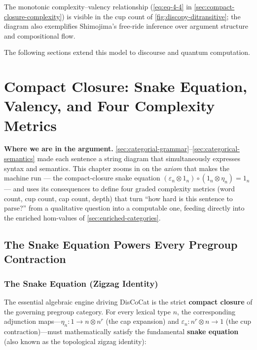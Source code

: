 \documentclass[
]{article}
\begin{document}
The monotonic complexity--valency relationship (\autoref{eq:eq-4-4} in
\autoref{sec:compact-closure-complexity}) is visible in the cup count of
\autoref{fig:discopy-ditransitive}; the diagram also exemplifies
Shimojima's \citeyearpar{shimojima1996reasoning} free-ride inference
over argument structure and compositional flow.

The following sections extend this model to discourse and quantum
computation.

\newpage

\section{Compact Closure: Snake Equation, Valency, and Four Complexity
Metrics}\label{sec:compact-closure-complexity}

\textbf{Where we are in the argument.}
\autoref{sec:categorial-grammar}--\autoref{sec:categorical-semantics}
made each sentence a string diagram that simultaneously expresses syntax
and semantics. This chapter zooms in on the \emph{axiom} that makes the
machine run --- the compact-closure snake equation
\((\varepsilon_n \otimes 1_n) \circ (1_n \otimes \eta_n) = 1_n\) --- and
uses its consequences to define four graded complexity metrics (word
count, cup count, cap count, depth) that turn ``how hard is this
sentence to parse?'' from a qualitative question into a computable one,
feeding directly into the enriched hom-values of
\autoref{sec:enriched-categories}.

\subsection{The Snake Equation Powers Every Pregroup
Contraction}\label{the-snake-equation-powers-every-pregroup-contraction}

\subsubsection{The Snake Equation (Zigzag
Identity)}\label{the-snake-equation-zigzag-identity}

The essential algebraic engine driving DisCoCat is the strict
\textbf{compact closure} of the governing pregroup category. For every
lexical type \(n\), the corresponding adjunction
maps---\(\eta_n: 1 \to n \otimes n^r\) (the cap expansion) and
\(\varepsilon_n: n^r \otimes n \to 1\) (the cup contraction)---must
mathematically satisfy the fundamental \textbf{snake equation} (also
known as the topological zigzag identity):
\end{document}
